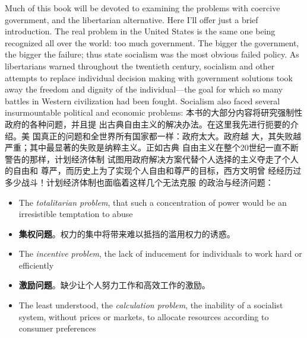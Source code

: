 \begin{paracol}{2}
Much of this book will be devoted to examining the problems
with coercive government, and the libertarian alternative. Here
I'll offer just a brief introduction. The real problem in the
United States is the same one being recognized all over the
world: too much government. The bigger the government, the
bigger the failure; thus state socialism was the most obvious
failed policy. As libertarians warned throughout the twentieth
century, socialism and other attempts to replace individual decision making with government solutions took away the freedom
and dignity of the individual---the goal for which so many battles in Western civilization had been fought. Socialism also
faced several insurmountable political and economic problems:
\switchcolumn
本书的大部分内容将研究强制性政府的各种问题，并且提
出古典自由主义的解决办法。在这里我先进行扼要的介绍。美
国真正的问题和全世界所有国家都一样：政府太大。政府越
大，其失败越严重；其中最显著的失败是纳粹主义。正如古典
自由主义在整个20世纪一直不断警告的那样，计划经济体制
试图用政府解决方案代替个人选择的主义夺走了个人的自由和
尊严，而历史上为了实现个人自由和尊严的目标，西方文明曾
经经历过多少战斗！计划经济体制也面临着这样几个无法克服
的政治与经济问题：
\switchcolumn*
\begin{itemize}
	\item The \textit{totalitarian problem}, that such a concentration of power	would be an irresistible temptation to abuse
\end{itemize}
\switchcolumn
\begin{itemize}
	\item \textbf{集权问题}。权力的集中将带来难以抵挡的滥用权力的诱惑。
\end{itemize}
\switchcolumn*
\begin{itemize}
	\item The\textit{ incentive problem}, the lack of inducement for individuals to work hard or efficiently
\end{itemize}
\switchcolumn
\begin{itemize}
	\item \textbf{激励问题}。缺少让个人努力工作和高效工作的激励。
\end{itemize}
\switchcolumn*
\begin{itemize}
	\item The least understood, the \textit{calculation problem}, the inability of a socialist system, without prices or markets, to allocate resources according to consumer preferences

\end{itemize}
\end{paracol}
